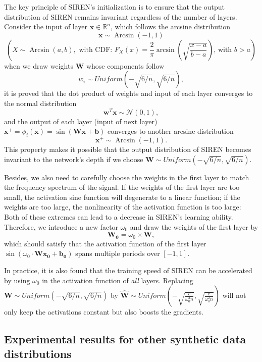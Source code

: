 \documentclass{article}
\begin{document}
The key principle of SIREN's initialization is to ensure that the output distribution of SIREN remains invariant regardless of the number of layers.
Consider the input of layer $\mathbf{x} \in \mathbb{R}^n$, which follows the arcsine distribution
$$\mathbf{x}  \sim \operatorname{Arcsin}(-1,1)$$
$$(
X \sim \operatorname{Arcsin}(a, b), \text { with CDF: } F_X(x)=\frac{2}{\pi} \arcsin \left(\sqrt{\frac{x-a}{b-a}}\right) \text {, with } b>a
)$$
when we draw weights $\mathbf{W}$ whose components follow 
$$
w_i \sim Uniform (-\sqrt{6/n}, \sqrt{6/n}),
$$
it is proved that the dot product of weights and input of each layer converges to the normal distribution 
$$
\mathbf{w}^T \mathbf{x} \sim \mathcal{N}\left(0, 1\right),
$$
and the output of each layer (input of next layer) $\mathbf{x}^+=\phi_i\left(\mathbf{x}\right)=\sin \left(\mathbf{W} \mathbf{x}+\mathbf{b}\right)$ converges to another arcsine distribution
$$\mathbf{x}^+  \sim \operatorname{Arcsin}(-1,1).$$
This property makes it possible that the output distribution of SIREN becomes invariant to the network's depth if we choose $\mathbf{W} \sim Uniform (-\sqrt{6/n}, \sqrt{6/n}).$


Besides, we also need to carefully choose the weights in the first layer to match the frequency spectrum of the signal.
If the weights of the first layer are too small, the activation sine function will degenerate to a linear function; if the weights are too large, the nonlinearity of the activation function is too large:  Both of these extremes can lead to a decrease in SIREN's learning ability.
Therefore, we introduce a new factor $\omega_0$  and  draw the weights of the first layer by
$$
\mathbf{W_0} = \omega_0 \times \mathbf{W},
$$
which should satisfy that the activation function of the first layer $\sin \left(\omega_0 \cdot \mathbf{W} \mathbf{x_0}+\mathbf{b_0}\right)$ spans multiple periods over $[-1,1]$.

In practice, it is also found that the training speed of SIREN can be accelerated by using $\omega_0$ in the activation function of \textit{all} layers.
Replacing $\mathbf{W} \sim Uniform (-\sqrt{6/n}, \sqrt{6/n})$ by
$
\widehat {\mathbf{W}} \sim Uniform\left(-\sqrt{\frac{c}{\omega_0^2 n}}, \sqrt{\frac{c}{\omega_0^2 n}}\right)
$ 
will not only keep the activations constant but also boosts the gradients.


\subsection{Experimental results for other synthetic data distributions}
\label{Experiments}
\end{document}
